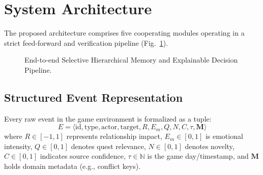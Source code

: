 \documentclass[conference]{IEEEtran}
\begin{document}
\section{System Architecture}
The proposed architecture comprises five cooperating modules operating in a strict feed-forward and verification pipeline (Fig.~\ref{fig:architecture}).

\begin{figure}[htbp]
\centerline{}
\caption{End-to-end Selective Hierarchical Memory and Explainable Decision Pipeline.}
\label{fig:architecture}
\end{figure}

\subsection{Structured Event Representation}
Every raw event in the game environment is formalized as a tuple:
\begin{equation}
E = \langle \text{id}, \text{type}, \text{actor}, \text{target}, R, E_m, Q, N, C, \tau, \mathbf{M} \rangle
\end{equation}
where $R \in [-1, 1]$ represents relationship impact, $E_m \in [0, 1]$ is emotional intensity, $Q \in [0, 1]$ denotes quest relevance, $N \in [0, 1]$ denotes novelty, $C \in [0, 1]$ indicates source confidence, $\tau \in \mathbb{N}$ is the game day/timestamp, and $\mathbf{M}$ holds domain metadata (e.g., conflict keys).
\end{document}
